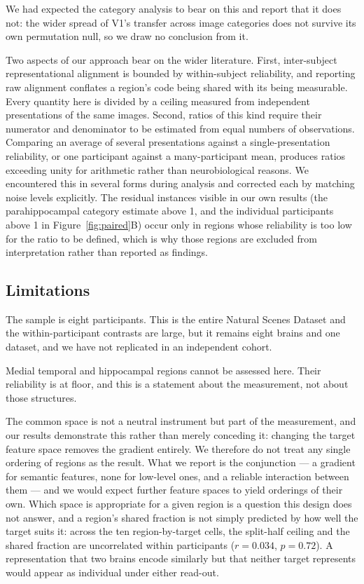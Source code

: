 \documentclass[11pt,a4paper]{article}
\begin{document}
We had expected the category analysis to bear on this and report that it does
not: the wider spread of V1's transfer across image categories does not survive
its own permutation null, so we draw no conclusion from it.

Two aspects of our approach bear on the wider literature. First, inter-subject
representational alignment is bounded by within-subject reliability, and
reporting raw alignment conflates a region's code being shared with its being
measurable. Every quantity here is divided by a ceiling measured from independent
presentations of the same images. Second, ratios of this kind require their
numerator and denominator to be estimated from equal numbers of observations.
Comparing an average of several presentations against a single-presentation
reliability, or one participant against a many-participant mean, produces ratios
exceeding unity for arithmetic rather than neurobiological reasons. We
encountered this in several forms during analysis and corrected each by matching
noise levels explicitly. The residual instances visible in our own results (the
parahippocampal category estimate above 1, and the individual participants
above 1 in Figure~\ref{fig:paired}B) occur only in regions whose reliability
is too low for the ratio to be defined, which is why those regions are excluded
from interpretation rather than reported as findings.

\subsection{Limitations}

The sample is eight participants. This is the entire Natural Scenes Dataset and
the within-participant contrasts are large, but it remains eight brains and one
dataset, and we have not replicated in an independent cohort.

Medial temporal and hippocampal regions cannot be assessed here. Their
reliability is at floor, and this is a statement about the measurement, not about
those structures.

The common space is not a neutral instrument but part of the measurement, and our
results demonstrate this rather than merely conceding it: changing the target
feature space removes the gradient entirely. We therefore do not treat any
single ordering of regions as the result. What we report is the conjunction
--- a gradient for semantic features, none for low-level ones, and a reliable
interaction between them --- and we would expect further feature spaces to
yield orderings of their own. Which space is appropriate for a given region is
a question this design does not answer, and a region's shared fraction is not
simply predicted by how well the target suits it: across the ten
region-by-target cells, the split-half ceiling and the shared fraction are
uncorrelated within participants ($r = \num{0.034}$, $p = 0.72$). A
representation that two brains encode similarly but that neither target
represents would appear as individual under either read-out.
\end{document}
